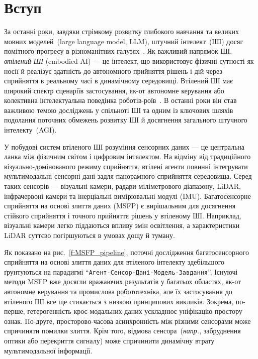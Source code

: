 \section{Вступ}
\label{s:introduction}


За останні роки, завдяки стрімкому розвитку глибокого навчання та великих мовних моделей~(large language model, LLM), штучний інтелект~(ШІ) досяг помітного прогресу в різноманітних галузях~\cite{ruan2021dae,ruan2025cpws,ruan2024color}.
Як важливий напрямок ШІ, \emph{втілений ШІ} (embodied AI) — це інтелект, що використовує фізичні сутності як носії й реалізує здатність до автономного прийняття рішень і дій через сприйняття в реальному часі в динамічному середовищі.
Втілений ШІ має широкий спектр сценаріїв застосування, як-от автономне керування або колективна інтелектуальна поведінка роботів-роїв~\cite{ren2024embodied,gupta2021embodied}. В останні роки він став важливою темою досліджень у спільноті ШІ
та одним із ключових шляхів подолання поточних обмежень розвитку ШІ й досягнення загального штучного інтелекту~(AGI).

У побудові систем втіленого ШІ розуміння сенсорних даних — це центральна ланка між фізичним світом і цифровим інтелектом. На відміну від традиційного візуально-домінованого режиму сприйняття, втілені агенти повинні інтегрувати мультимодальні сенсорні дані задля панорамного сприйняття середовища. Серед таких сенсорів — візуальні камери, радари міліметрового діапазону, LiDAR, інфрачервоні камери та інерціальні вимірювальні модулі (IMU).
Багатосенсорне сприйняття на основі злиття даних (MSFP) є вирішальним для досягнення стійкого сприйняття і точного прийняття рішень у втіленому ШІ. Наприклад, візуальні камери легко піддаються впливу змін освітлення, а характеристики LiDAR суттєво погіршуються в умовах дощу й туману.

Як показано на рис.~\ref{f:MSFP_pipeline}, поточні дослідження багатосенсорного сприйняття на основі злиття даних для втіленого інтелекту здебільшого ґрунтуються на парадигмі ``\texttt{Агент-Сенсор-Дані-Модель-Завдання}''.
Існуючі методи MSFP вже досягли вражаючих результатів у багатьох областях, як-от автономне керування та промислова робототехніка, але їх застосування до втіленого ШІ все ще стикається з низкою принципових викликів. Зокрема, по-перше, гетерогенність крос-модальних даних ускладнює уніфікацію простору ознак.
По-друге, просторово-часова асинхронність між різними сенсорами може спричиняти помилки злиття.
Крім того, відмова сенсора~(\textit{напр.}, забруднення оптики або перекриття сигналу) може спричинити динамічну втрату мультимодальної інформації.

